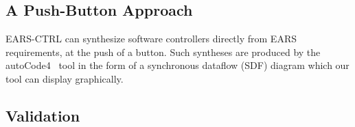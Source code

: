 \subsection{A Push-Button Approach}

\textsf{EARS-CTRL} can synthesize software controllers directly from EARS
requirements, at the push of a button. Such syntheses are produced 
by the \textsf{autoCode4}~\cite{autoCode17} tool in the form
of a synchronous dataflow (SDF) diagram which our tool can display
graphically.


\subsection{Validation}


